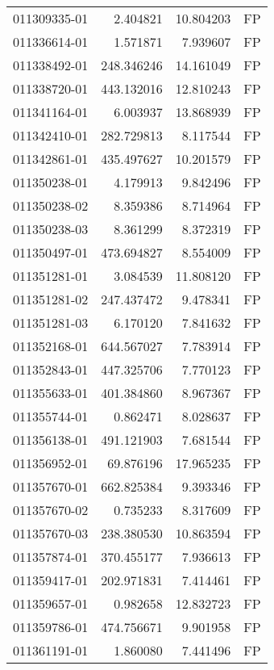\begin{tabular}{lrrl}
011309335-01 &    2.404821 &      10.804203 &   FP \\
011336614-01 &    1.571871 &       7.939607 &   FP \\
011338492-01 &  248.346246 &      14.161049 &   FP \\
011338720-01 &  443.132016 &      12.810243 &   FP \\
011341164-01 &    6.003937 &      13.868939 &   FP \\
011342410-01 &  282.729813 &       8.117544 &   FP \\
011342861-01 &  435.497627 &      10.201579 &   FP \\
011350238-01 &    4.179913 &       9.842496 &   FP \\
011350238-02 &    8.359386 &       8.714964 &   FP \\
011350238-03 &    8.361299 &       8.372319 &   FP \\
011350497-01 &  473.694827 &       8.554009 &   FP \\
011351281-01 &    3.084539 &      11.808120 &   FP \\
011351281-02 &  247.437472 &       9.478341 &   FP \\
011351281-03 &    6.170120 &       7.841632 &   FP \\
011352168-01 &  644.567027 &       7.783914 &   FP \\
011352843-01 &  447.325706 &       7.770123 &   FP \\
011355633-01 &  401.384860 &       8.967367 &   FP \\
011355744-01 &    0.862471 &       8.028637 &   FP \\
011356138-01 &  491.121903 &       7.681544 &   FP \\
011356952-01 &   69.876196 &      17.965235 &   FP \\
011357670-01 &  662.825384 &       9.393346 &   FP \\
011357670-02 &    0.735233 &       8.317609 &   FP \\
011357670-03 &  238.380530 &      10.863594 &   FP \\
011357874-01 &  370.455177 &       7.936613 &   FP \\
011359417-01 &  202.971831 &       7.414461 &   FP \\
011359657-01 &    0.982658 &      12.832723 &   FP \\
011359786-01 &  474.756671 &       9.901958 &   FP \\
011361191-01 &    1.860080 &       7.441496 &   FP \\

\end{tabular}
